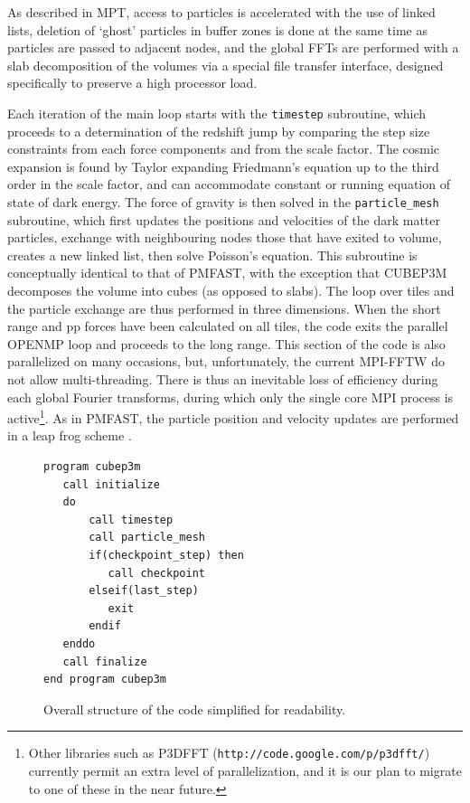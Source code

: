 \documentclass[useAMS,usenatbib]{mn2e}
\begin{document}
As described in MPT, access to particles is accelerated with the use of linked lists, deletion of `ghost' particles
in buffer zones is done at the same time as particles are passed to adjacent nodes,
and the global FFTs are performed with a slab decomposition of the volumes via a special file transfer interface, 
designed specifically to preserve a high processor load.


Each iteration of the main loop starts with the {\tt timestep} subroutine, 
which proceeds to a determination of the redshift jump by comparing the step size constraints from each
force components and from the scale factor.
The cosmic expansion is found by Taylor expanding Friedmann's equation up to the third order in the scale factor,
and can accommodate constant or running equation of state of dark energy.
The force of gravity is then solved  in the {\tt particle\_mesh} subroutine,
which first updates the positions and velocities of the dark matter particles, exchange with neighbouring nodes those that have exited to volume,
creates a new linked list, then solve Poisson's equation.  This subroutine is conceptually identical to that of {\small PMFAST}, 
with the exception  that {\small CUBEP3M} decomposes the volume into cubes (as opposed to slabs). 
The loop over tiles and the particle exchange are thus performed in three dimensions.
When the short range and pp forces have been calculated on all tiles, the code exits the parallel {\small OPENMP} loop
and proceeds to the long range. This section of the code is also parallelized on many occasions, but, unfortunately, the current {\small MPI-FFTW}
do not allow multi-threading. There is thus an inevitable loss of efficiency during each global Fourier transforms, during which
only the single core {\small MPI} process is active\footnote{Other libraries such as {\small P3DFFT} ({\tt http://code.google.com/p/p3dfft/}) currently permit
 an extra level of parallelization, and it is our plan to migrate to one of these in the near future.}.
 As in {\small PMFAST}, the particle position and velocity updates are performed in a leap frog scheme \citep{1981csup.book.....H}.


\begin{figure}
\begin{verbatim}
program cubep3m
   call initialize
   do
       call timestep
       call particle_mesh
       if(checkpoint_step) then
          call checkpoint
       elseif(last_step)
          exit
       endif
   enddo
   call finalize
end program cubep3m
\end{verbatim}
\caption{Overall structure of the code simplified for readability.}
\label{fig:structure}
\end{figure}
\end{document}
